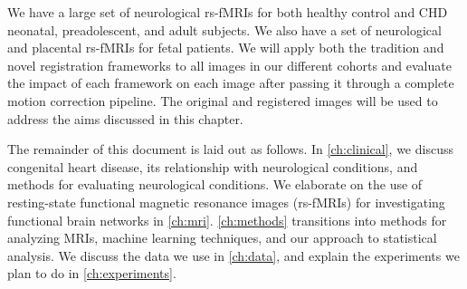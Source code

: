 We have a large set of neurological rs-fMRIs for both healthy control and CHD neonatal, preadolescent, and adult subjects. We also have a set of neurological and placental rs-fMRIs for fetal patients. We will apply both the tradition and novel registration frameworks to all images in our different cohorts and evaluate the impact of each framework on each image after passing it through a complete motion correction pipeline. The original and registered images will be used to address the aims discussed in this chapter.

The remainder of this document is laid out as follows. In \autoref{ch:clinical}, we discuss congenital heart disease, its relationship with neurological conditions, and methods for evaluating neurological conditions. We elaborate on the use of resting-state functional magnetic resonance images (rs-fMRIs) for investigating functional brain networks in \autoref{ch:mri}. \autoref{ch:methods} transitions into methods for analyzing MRIs, machine learning techniques, and our approach to statistical analysis. We discuss the data we use in \autoref{ch:data}, and explain the experiments we plan to do in \autoref{ch:experiments}.